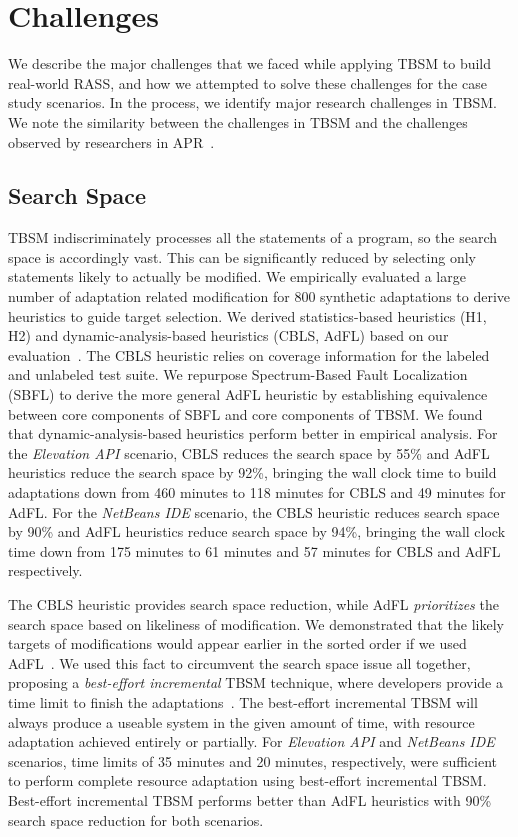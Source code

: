 \section{Challenges}
We describe the major challenges that we faced while applying TBSM to build real-world RASS, and how we attempted to solve these challenges for the case study scenarios. In the process, we identify major research challenges in TBSM. We note the similarity between the challenges in TBSM and the challenges observed by researchers in APR~\cite{LeGoues2013}.

\subsection{Search Space}
TBSM indiscriminately processes all the statements of a program, so the search space is accordingly vast. This can be significantly reduced by selecting only statements likely to actually be modified. We empirically evaluated a large number of adaptation related modification for 800 synthetic adaptations to derive heuristics to guide target selection. We derived statistics-based heuristics (H1, H2) and dynamic-analysis-based heuristics (CBLS, AdFL) based on our evaluation~\cite{christi2018qrs,christi2019qrs}. The CBLS heuristic relies on coverage information for the labeled and unlabeled test suite. We repurpose Spectrum-Based Fault Localization (SBFL) to derive the more general AdFL heuristic by establishing equivalence between core components of SBFL and core components of TBSM. We found that dynamic-analysis-based heuristics  perform better in empirical analysis. For the \textit{Elevation API} scenario, CBLS reduces the search space by 55\% and AdFL heuristics reduce the search space by 92\%, bringing the wall clock time to build adaptations down from 460 minutes to 118 minutes for CBLS and 49 minutes for AdFL.  For the \textit{NetBeans IDE} scenario, the CBLS heuristic reduces search space by 90\% and AdFL heuristics reduce search space by 94\%, bringing the wall clock time down from 175 minutes to 61 minutes and 57 minutes for CBLS and AdFL respectively. 

The CBLS heuristic provides search space reduction, while AdFL \emph{prioritizes} the search space based on likeliness of modification. We demonstrated that the likely targets of modifications would appear earlier in the sorted order if we used AdFL~\cite{christi2019qrs}. We used this fact to circumvent the search space issue all together, proposing a \emph{best-effort incremental} TBSM technique, where developers provide a time limit to finish the adaptations~\cite{christi2019qrs}. The best-effort incremental TBSM will always produce a useable system in the given amount of time, with resource adaptation achieved entirely or partially. For \textit{Elevation API} and \textit{NetBeans IDE} scenarios, time limits of 35 minutes and 20 minutes, respectively, were sufficient to perform complete resource adaptation using best-effort incremental TBSM. Best-effort incremental TBSM performs better than AdFL heuristics with 90\% search space reduction for both scenarios. 

